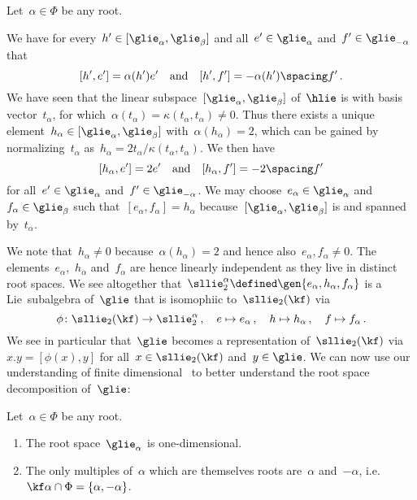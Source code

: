 \begin{construction}
  \label{construction of S alpha}
    Let~$\alpha \in \Phi$ be any root.
    
    We have for every~$h' \in [\glie_\alpha, \glie_\beta]$ and all~$e' \in \glie_\alpha$ and~$f' \in \glie_{-\alpha}$ that
    \[
      [h', e']
      =
      \alpha(h') e'
      \quad\text{and}\quad
      [h', f']
      =
      -\alpha(h') \spacing f'  \,.
    \]
    We have seen that the linear subspace~$[\glie_\alpha, \glie_\beta]$ of~$\hlie$ is {\onedimensional} with basis vector~$t_\alpha$, for which~$\alpha(t_\alpha) = \kappa(t_\alpha, t_\alpha) \neq 0$.
    Thus there exists a unique element~$h_\alpha \in [\glie_\alpha, \glie_\beta]$ with~$\alpha(h_\alpha) = 2$, which can be gained by normalizing~$t_\alpha$ as~$h_\alpha = 2 t_\alpha / \kappa(t_\alpha, t_\alpha)$.
    We then have
    \[
      [h_\alpha, e']
      =
      2 e'
      \quad\text{and}\quad
      [h_\alpha, f']
      =
      -2 \spacing f'
    \]
    for all~$e' \in \glie_\alpha$ and~$f' \in \glie_{-\alpha}$.
    We may choose~$e_\alpha \in \glie_\alpha$ and~$f_\alpha \in \glie_\beta$ such that~$[e_\alpha, f_\alpha] = h_\alpha$ because~$[\glie_\alpha, \glie_\beta]$ is {\onedimensional} and spanned by~$t_\alpha$.
    
    We note that~$h_\alpha \neq 0$ because~$\alpha(h_\alpha) = 2$ and hence also~$e_\alpha, f_\alpha \neq 0$.
    The elements~$e_\alpha$,~$h_\alpha$ and~$f_\alpha$ are hence linearly independent as they live in distinct root spaces.
    We see altogether that~$\sllie_2^\alpha \defined \gen{e_\alpha, h_\alpha, f_\alpha}$ is a {\threedimensional} Lie~subalgebra of~$\glie$ that is isomophiic to~$\sllie_2(\kf)$ via
    \[
      \phi
      \colon
      \sllie_2(\kf)
      \to
      \sllie_2^\alpha \,,
      \quad
      e
      \mapsto
      e_\alpha  \,,
      \quad
      h
      \mapsto
      h_\alpha  \,,
      \quad
      f
      \mapsto
      f_\alpha  \,.
    \]
    We see in particular that~$\glie$ becomes a representation of~$\sllie_2(\kf)$ via~$x.y = [\phi(x), y]$ for all~$x \in \sllie_2(\kf)$ and~$y \in \glie$.
    We can now use our understanding of finite dimensional~{} to better understand the root space decomposition of~$\glie$:
\end{construction}


\begin{proposition}
  \label{roots spaces are onedimensional and reduced}
  Let~$\alpha \in \Phi$ be any root.
  \begin{enumerate}
    \item
      The root space~$\glie_\alpha$ is one-dimensional.
    \item
      The only multiples of~$\alpha$ which are themselves roots are~$\alpha$ and~$-\alpha$, i.e.~$\kf \alpha \cap \Phi = \{\alpha, -\alpha\}$.
  \end{enumerate}
\end{proposition}


